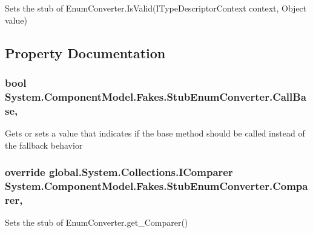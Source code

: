 Sets the stub of Enum\-Converter.\-Is\-Valid(\-I\-Type\-Descriptor\-Context context, Object value)



\subsection{Property Documentation}
\hypertarget{class_system_1_1_component_model_1_1_fakes_1_1_stub_enum_converter_ab2e8f4b613d35bc7494e3b42841ab710}{
\subsubsection[{Call\-Base}]{\setlength{\rightskip}{0pt plus 5cm}bool System.\-Component\-Model.\-Fakes.\-Stub\-Enum\-Converter.\-Call\-Base\hspace{0.3cm}{\ttfamily [get]}, {\ttfamily [set]}}}\label{class_system_1_1_component_model_1_1_fakes_1_1_stub_enum_converter_ab2e8f4b613d35bc7494e3b42841ab710}


Gets or sets a value that indicates if the base method should be called instead of the fallback behavior

\hypertarget{class_system_1_1_component_model_1_1_fakes_1_1_stub_enum_converter_a95dc70690fb11100819f73cedd5303af}{
\subsubsection[{Comparer}]{\setlength{\rightskip}{0pt plus 5cm}override global.\-System.\-Collections.\-I\-Comparer System.\-Component\-Model.\-Fakes.\-Stub\-Enum\-Converter.\-Comparer\hspace{0.3cm}{\ttfamily [get]}, {\ttfamily [protected]}}}\label{class_system_1_1_component_model_1_1_fakes_1_1_stub_enum_converter_a95dc70690fb11100819f73cedd5303af}


Sets the stub of Enum\-Converter.\-get\-\_\-\-Comparer()

